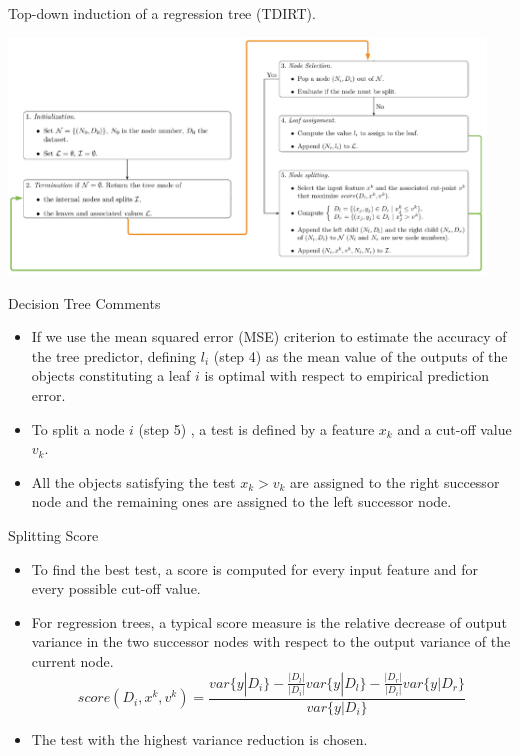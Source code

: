 \begin{frame}{Top-down induction of a regression tree (TDIRT).}

  \includegraphics[width=0.95\textwidth]{images/TDIDT.png}


\end{frame}
\begin{frame}{Decision Tree Comments}
    \begin{itemize}
        \item If we use the mean squared error (MSE) criterion to estimate the accuracy of the tree predictor, defining $l_i$ (step 4) as the mean value of the outputs of the objects constituting a leaf $i$ is optimal with respect to empirical prediction error.
        \item To \alert{split} a node $i$ (step 5) , a test is defined by a feature $x_k$ and a cut-off value $v_k$.
        \item All the objects satisfying the test $x_k > v_k$ are assigned to the right successor node and the remaining ones are assigned to the left successor node.
    \end{itemize}
\end{frame}

\begin{frame}{Splitting Score}
    \begin{itemize}
        \item To find the best test, a score is computed for every input feature and for every possible cut-off value.
        \item For regression trees, a typical score measure is the relative decrease of output variance in the two successor nodes with respect to the output variance of the current node.
        $$score(D_i, x^k, v^k) = \frac{var\{y|D_i\} - \frac{|D_l|}{|D_i|} var\{y|D_l\} - \frac{|D_r|}{|D_i|} var\{y|D_r\}}{var\{y|D_i\}}$$
        \item The test with the highest variance reduction is chosen. 
    \end{itemize}
\end{frame}

